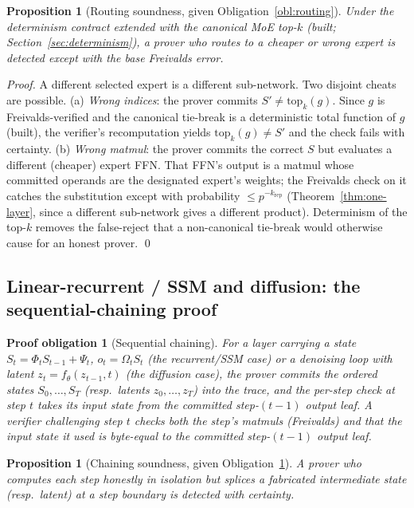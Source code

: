 \documentclass[11pt]{article}
\newtheorem{proposition}[theorem]{Proposition}
\newtheorem{obligation}{Proof obligation}
\begin{document}
\begin{proposition}[Routing soundness, given Obligation~\ref{obl:routing}]
\label{prop:routing-sound}
Under the determinism contract extended with the canonical MoE top-$k$ (built;
Section~\ref{sec:determinism}), a prover who routes to a cheaper or wrong expert is detected
except with the base Freivalds error.
\end{proposition}

\begin{proof}
A different selected expert is a different sub-network. Two disjoint cheats are possible. (a)
\emph{Wrong indices}: the prover commits $S' \ne \mathrm{top}_k(g)$. Since $g$ is
Freivalds-verified and the canonical tie-break is a deterministic total function of $g$
(built), the verifier's recomputation yields $\mathrm{top}_k(g) \ne S'$ and the check fails
with certainty. (b) \emph{Wrong matmul}: the prover commits the correct $S$ but evaluates a
different (cheaper) expert FFN. That FFN's output is a matmul whose committed operands are the
designated expert's weights; the Freivalds check on it catches the substitution except with
probability $\le p^{-k_{\mathrm{rep}}}$ (Theorem~\ref{thm:one-layer}, since a different
sub-network gives a different product). Determinism of the top-$k$ removes the false-reject
that a non-canonical tie-break would otherwise cause for an honest prover. \qed
\end{proof}

\subsection{Linear-recurrent / SSM and diffusion: the sequential-chaining proof}

\begin{obligation}[Sequential chaining]
\label{obl:chaining}
For a layer carrying a state $S_t = \Phi_t S_{t-1} + \Psi_t$, $o_t = \Omega_t S_t$ (the
recurrent/SSM case) or a denoising loop with latent $z_t = f_{\theta}(z_{t-1}, t)$ (the
diffusion case), the prover commits the ordered states $S_0,\dots,S_T$ (resp.\ latents
$z_0,\dots,z_T$) into the trace, and the per-step check at step $t$ takes its input state from
the committed step-$(t-1)$ output leaf. A verifier challenging step $t$ checks both the step's
matmuls (Freivalds) and that the input state it used is byte-equal to the committed
step-$(t-1)$ output leaf.
\end{obligation}

\begin{proposition}[Chaining soundness, given Obligation~\ref{obl:chaining}]
\label{prop:chaining-sound}
A prover who computes each step honestly in isolation but splices a fabricated intermediate
state (resp.\ latent) at a step boundary is detected with certainty.
\end{proposition}
\end{document}
